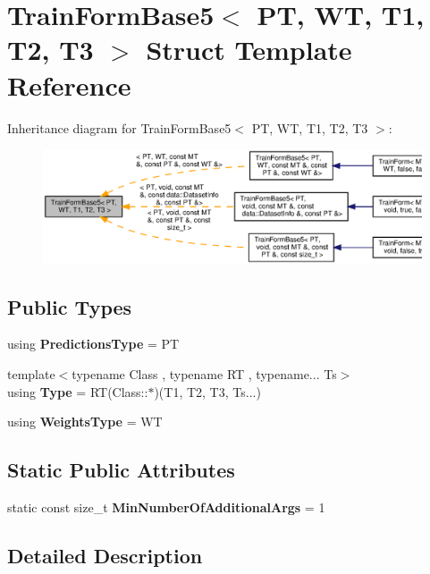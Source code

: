 \section{Train\+Form\+Base5$<$ PT, WT, T1, T2, T3 $>$ Struct Template Reference}
\label{structmlpack_1_1cv_1_1TrainFormBase5}


Inheritance diagram for Train\+Form\+Base5$<$ PT, WT, T1, T2, T3 $>$\+:
\nopagebreak
\begin{figure}[H]
\begin{center}
\leavevmode
\includegraphics[width=350pt]{structmlpack_1_1cv_1_1TrainFormBase5__inherit__graph}
\end{center}
\end{figure}
\subsection*{Public Types}
\begin{DoxyCompactItemize}
\item 
using \textbf{ Predictions\+Type} = PT
\item 
{\footnotesize template$<$typename Class , typename RT , typename... Ts$>$ }\\using \textbf{ Type} = RT(Class\+::$\ast$)(T1, T2, T3, Ts...)
\item 
using \textbf{ Weights\+Type} = WT
\end{DoxyCompactItemize}
\subsection*{Static Public Attributes}
\begin{DoxyCompactItemize}
\item 
static const size\+\_\+t \textbf{ Min\+Number\+Of\+Additional\+Args} = 1
\end{DoxyCompactItemize}


\subsection{Detailed Description}
